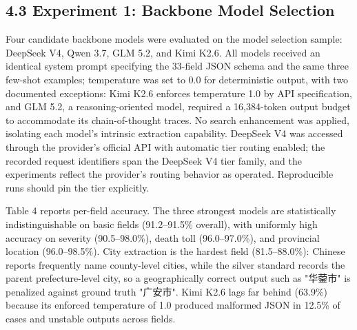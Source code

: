 \documentclass[11pt]{article}
\begin{document}
\subsection{4.3 Experiment 1: Backbone Model Selection}
Four candidate backbone models were evaluated on the model selection sample: DeepSeek V4, Qwen 3.7, GLM 5.2, and Kimi K2.6. All models received an identical system prompt specifying the 33-field JSON schema and the same three few-shot examples; temperature was set to 0.0 for deterministic output, with two documented exceptions: Kimi K2.6 enforces temperature 1.0 by API specification, and GLM 5.2, a reasoning-oriented model, required a 16,384-token output budget to accommodate its chain-of-thought traces. No search enhancement was applied, isolating each model's intrinsic extraction capability. DeepSeek V4 was accessed through the provider's official API with automatic tier routing enabled; the recorded request identifiers span the DeepSeek V4 tier family, and the experiments reflect the provider's routing behavior as operated. Reproducible runs should pin the tier explicitly.

Table 4 reports per-field accuracy. The three strongest models are statistically indistinguishable on basic fields (91.2--91.5\% overall), with uniformly high accuracy on severity (90.5--98.0\%), death toll (96.0--97.0\%), and provincial location (96.0--98.5\%). City extraction is the hardest field (81.5--88.0\%): Chinese reports frequently name county-level cities, while the silver standard records the parent prefecture-level city, so a geographically correct output such as "{\cjkfont 华蓥市}" is penalized against ground truth "{\cjkfont 广安市}". Kimi K2.6 lags far behind (63.9\%) because its enforced temperature of 1.0 produced malformed JSON in 12.5\% of cases and unstable outputs across fields.
\end{document}
